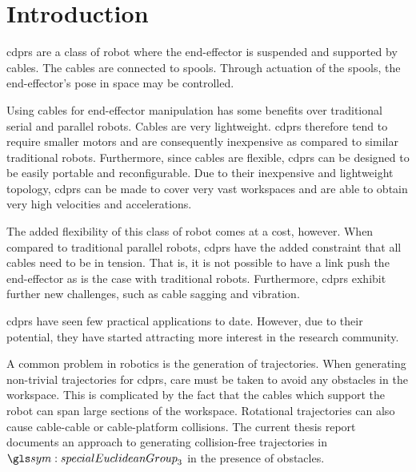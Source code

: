 \chapter{Introduction}%
\label{chap:introduction}

	\glsresetall

	\glspl{cdpr} are a class of robot where the end-effector is suspended and
	supported by cables. The cables are connected to spools. Through actuation
	of the spools, the end-effector's pose in space may be controlled.

	Using cables for end-effector manipulation has some benefits over
	traditional serial and parallel robots. Cables are very lightweight.
	\glspl{cdpr} therefore tend to require smaller motors and are consequently
	inexpensive as compared to similar traditional robots. Furthermore, since
	cables are flexible, \glspl{cdpr} can be designed to be easily portable and
	reconfigurable. Due to their inexpensive and lightweight topology,
	\glspl{cdpr} can be made to cover very vast workspaces and are able to
	obtain very high velocities and accelerations.

	The added flexibility of this class of robot comes at a cost, however. When
	compared to traditional parallel robots, \glspl{cdpr} have the added
	constraint that all cables need to be in tension. That is, it is not
	possible to have a link push the end-effector as is the case with
	traditional robots. Furthermore, \glspl{cdpr} exhibit further new
	challenges, such as cable sagging and vibration.

	\glspl{cdpr} have seen few practical applications to date. However, due to
	their potential, they have started attracting more interest in the research
	community.

	A common problem in robotics is the generation of trajectories.  When
	generating non-trivial trajectories for \glspl{cdpr}, care must be taken to
	avoid any obstacles in the workspace. This is complicated by the fact that
	the cables which support the robot can span large sections of the workspace.
	Rotational trajectories can also cause cable-cable or cable-platform
	collisions. The current thesis report documents an approach to generating
	collision-free trajectories in $\specialEuclideanGroup{3}$ in the presence
	of obstacles.

